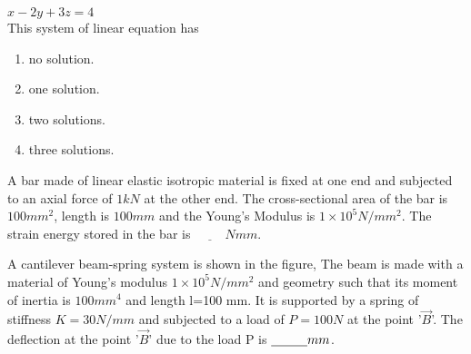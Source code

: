 		$x-2y+3z=4$ \\
		This system of linear equation has
		\begin{enumerate}
			\item no solution.
			\item one solution.
			\item two solutions.
			\item three solutions.
		\end{enumerate}
	\item A bar made of linear elastic isotropic material is fixed at one end and subjected to an axial force of $1 kN$ at the other end. The cross-sectional area of the bar is $100 mm^2$, length is $100 mm$ and the Young's Modulus is $1 \times 10^5 N/mm^2$. The strain energy stored in the bar is $\underline{\hspace{1cm}} Nmm$.
	\item A cantilever beam-spring system is shown in the figure, The beam is made with a material of Young's modulus $1 \times 10^5 N/mm^2$ and geometry such that its moment of inertia is $100 mm^4$ and length l=100 mm. It is supported by a spring of stiffness $K=30 N/mm$ and subjected to a load of $P=100N$ at the point '$\vec{B}$'. The deflection at the point '$\vec{B}$' due to the load P is $\underline{\hspace{1 cm}}mm$.
